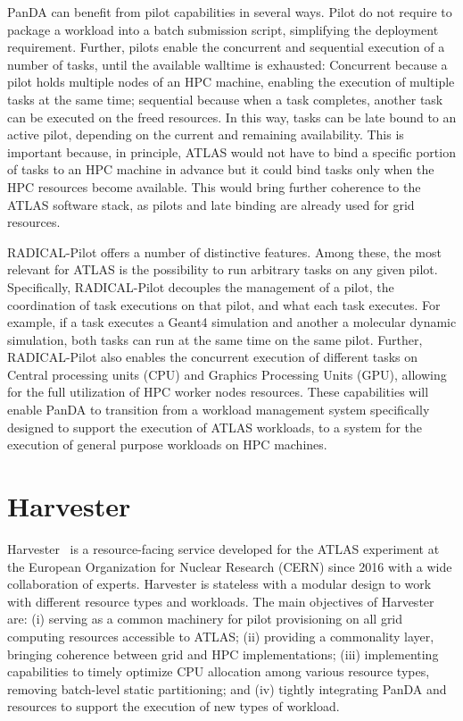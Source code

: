\documentclass{webofc}
\begin{document}
PanDA can benefit from pilot capabilities in several ways. Pilot do not
require to package a workload into a batch submission script, simplifying the
deployment requirement. Further, pilots enable the concurrent and sequential
execution of a number of tasks, until the available walltime is exhausted:
Concurrent because a pilot holds multiple nodes of an HPC machine, enabling
the execution of multiple tasks at the same time; sequential because when a
task completes, another task can be executed on the freed resources. In this
way, tasks can be late bound to an active pilot, depending on the current and
remaining availability. This is important because, in principle, ATLAS would
not have to bind a specific portion of tasks to an HPC machine in advance but
it could bind tasks only when the HPC resources become available. This would
bring further coherence to the ATLAS software stack, as pilots and late
binding are already used for grid resources.

RADICAL-Pilot offers a number of distinctive features. Among these, the most
relevant for ATLAS is the possibility to run arbitrary tasks on any given
pilot. Specifically, RADICAL-Pilot decouples the management of a pilot, the
coordination of task executions on that pilot, and what each task executes.
For example, if a task executes a Geant4 simulation and another a molecular
dynamic simulation, both tasks can run at the same time on the same pilot.
Further, RADICAL-Pilot also enables the concurrent execution of different
tasks on Central processing units (CPU) and Graphics Processing Units (GPU),
allowing for the full utilization of HPC worker nodes resources. These
capabilities will enable PanDA to transition from a workload management
system specifically designed to support the execution of ATLAS workloads, to
a system for the execution of general purpose workloads on HPC machines.


\section{Harvester}
\label{section:harvester}

Harvester~\cite{Megino_2017} is a resource-facing service developed for the
ATLAS experiment at the European Organization for Nuclear Research (CERN)
since 2016 with a wide collaboration of experts. Harvester is stateless with
a modular design to work with different resource types and workloads. The
main objectives of Harvester are: (i) serving as a common machinery for pilot
provisioning on all grid computing resources accessible to ATLAS; (ii)
providing a commonality layer, bringing coherence between grid and HPC
implementations; (iii) implementing capabilities to timely optimize CPU
allocation among various resource types, removing batch-level static
partitioning; and (iv) tightly integrating PanDA and resources to support the
execution of new types of workload.
\end{document}
